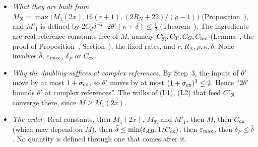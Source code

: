 \begin{detail}
\begin{step}
\begin{itemize}
\item \emph{What they are built from.} $M_{\mathfrak N}=\max\big(M_1(2x),16(r+1),(2R_N+22)/(\rho-1)\big)$ (Proposition~), and $M'_1$ is defined by $2C_d\delta^{-2}\cdot2\theta'(\kappa+\delta)\le\frac12$ (Theorem~). The ingredients are real-reference constants free of $M$, namely $C'_{\mathfrak N},C_T,C_G,C_{\rm loc}$ (Lemma~, the proof of Proposition~, Section~), the fixed rates, and $r,R_N,\rho,\kappa,\delta$. None involves $\bar\delta$, $\varepsilon_{\max}$, $\delta_P$ or $C_{\rm cx}$.
\item \emph{Why the doubling suffices at complex references.} By Step~3, the inputs of $\theta'$ move by at most $1+\sigma_{\rm cx}$, so $\theta'$ moves by at most $(1+\sigma_{\rm cx})^3\le2$. Hence ``$2\theta'$ bounds $\theta'$ at complex references''. The walks of (L1), (L2) that feed $C'_{\mathfrak N}$ converge there, since $M\ge M_1(2x)$.
\item \emph{The order.} Real constants, then $M_1(2x)$, $M_{\mathfrak N}$ and $M'_1$, then $M$, then $C_{\rm cx}$ (which may depend on $M$), then $\bar\delta\le\min(\delta_{AB},1/C_{\rm cx})$, then $\varepsilon_{\max}$, then $\delta_P\le\bar\delta$. No quantity is defined through one that comes after it.
\end{itemize}
\end{step}
\end{detail}


